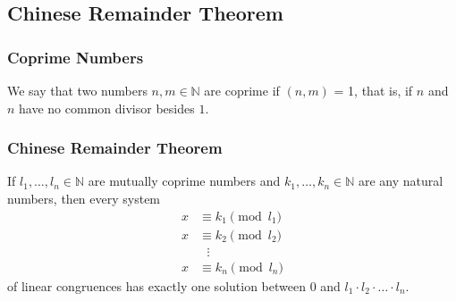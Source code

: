 \documentclass[aspectratio=169,11pt,usenames,dvipsnames,handout]{beamer}
\newcommand{\N}{\mathbb{N}}
\begin{document}
\subsection{Chinese Remainder Theorem}

\begin{frame}
 \subsectionpage
\end{frame}

\begin{frame}
 \frametitle{Coprime Numbers}
 \begin{tcolorbox}[title=Coprime Numbers]
  We say that two numbers $n,m \in \N$ are \alert{coprime} if $(n,m)$ = 1, that
  is, if $n$ and $n$ have no common divisor besides $1$.
 \end{tcolorbox}
\end{frame}

\begin{frame}
 \frametitle{Chinese Remainder Theorem}
 \begin{tcolorbox}[title=Chinese Remainder Theorem]
  If $l_1,\ldots,l_n \in \N$ are \alert{mutually coprime} numbers and
  $k_1,\ldots,k_n \in \N$ are any natural numbers, then every
  system
  \begin{equation*}
   \begin{split}
    x & \equiv k_1 \pmod{l_1}\\
    x & \equiv k_2 \pmod{l_2}\\
      &~~~\vdots\\
    x & \equiv k_n \pmod{l_n}
   \end{split}
  \end{equation*}
  of linear congruences has \alert{exactly one solution} between $0$ and $l_1
  \cdot l_2 \cdot \ldots \cdot l_n$.
 \end{tcolorbox}
\end{frame}
\end{document}
